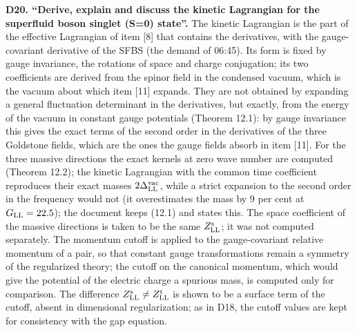 \documentclass[
  10pt,
]{article}
\begin{document}
\textbf{D20. ``Derive, explain and discuss the kinetic Lagrangian for
the superfluid boson singlet (S=0) state''.} The kinetic Lagrangian is
the part of the effective Lagrangian of item {[}8{]} that contains the
derivatives, with the gauge-covariant derivative of the SFBS (the demand
of 06:45). Its form is fixed by gauge invariance, the rotations of space
and charge conjugation; its two coefficients are derived from the spinor
field in the condensed vacuum, which is the vacuum about which item
{[}11{]} expands. They are not obtained by expanding a general
fluctuation determinant in the derivatives, but exactly, from the energy
of the vacuum in constant gauge potentials (Theorem 12.1): by gauge
invariance this gives the exact terms of the second order in the
derivatives of the three Goldstone fields, which are the ones the gauge
fields absorb in item {[}11{]}. For the three massive directions the
exact kernels at zero wave number are computed (Theorem 12.2); the
kinetic Lagrangian with the common time coefficient reproduces their
exact masses \(2\Delta^{\rm vac}_{\rm LL}\), while a strict expansion to
the second order in the frequency would not (it overestimates the mass
by 9 per cent at \(G_{\rm LL}=22.5\)); the document keeps (12.1) and
states this. The space coefficient of the massive directions is taken to
be the same \(Z^{\rm s}_{\rm LL}\); it was not computed separately. The
momentum cutoff is applied to the gauge-covariant relative momentum of a
pair, so that constant gauge transformations remain a symmetry of the
regularized theory; the cutoff on the canonical momentum, which would
give the potential of the electric charge a spurious mass, is computed
only for comparison. The difference
\(Z^{\rm s}_{\rm LL}\neq Z^{\rm t}_{\rm LL}\) is shown to be a surface
term of the cutoff, absent in dimensional regularization; as in D18, the
cutoff values are kept for consistency with the gap equation.
\end{document}
